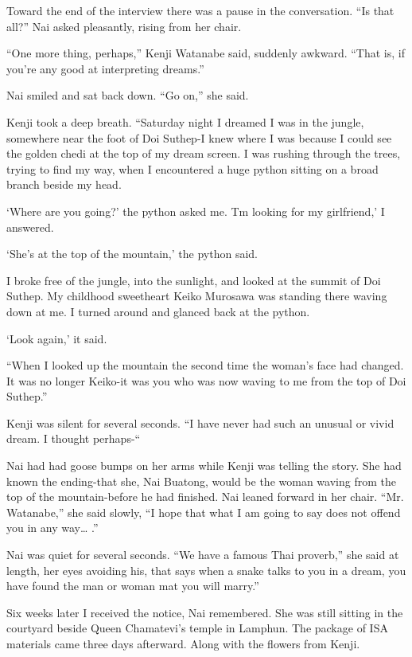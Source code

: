 \documentclass[]{article}
\begin{document}
{Toward the end of the interview there was a pause in the conversation.  “Is that all?” Nai asked pleasantly, rising from her chair.

“One more thing, perhaps,” Kenji Watanabe said, suddenly awkward.  “That is, if you’re any good at interpreting dreams.”

Nai smiled and sat back down.  “Go on,” she said.

Kenji took a deep breath.  “Saturday night I dreamed I was in the jungle, somewhere near the foot of Doi Suthep-I knew where I was because I could see the golden chedi at the top of my dream screen.  I was rushing through the trees, trying to find my way, when I encountered a huge python sitting on a broad branch beside my head.

‘Where are you going?’ the python asked me.  Tm looking for my girlfriend,’ I answered.

‘She’s at the top of the mountain,’ the python said.

I broke free of the jungle, into the sunlight, and looked at the summit of Doi Suthep.  My childhood sweetheart Keiko Murosawa was standing there waving down at me.  I turned around and glanced back at the python.

‘Look again,’ it said.

“When I looked up the mountain the second time the woman’s face had changed.  It was no longer Keiko-it was you who was now waving to me from the top of Doi Suthep.”

Kenji was silent for several seconds.  “I have never had such an unusual or vivid dream.  I thought perhaps-“

Nai had had goose bumps on her arms while Kenji was telling the story.  She had known the ending-that she, Nai Buatong, would be the woman waving from the top of the mountain-before he had finished.  Nai leaned forward in her chair.  “Mr.  Watanabe,” she said slowly, “I hope that what I am going to say does not offend you in any way… .”

Nai was quiet for several seconds.  “We have a famous Thai proverb,” she said at length, her eyes avoiding his, that says when a snake talks to you in a dream, you have found the man or woman mat you will marry.”

Six weeks later I received the notice, Nai remembered.  She was still sitting in the courtyard beside Queen Chamatevi’s temple in Lamphun.  The package of ISA materials came three days afterward.  Along with the flowers from Kenji.

}
\end{document}
